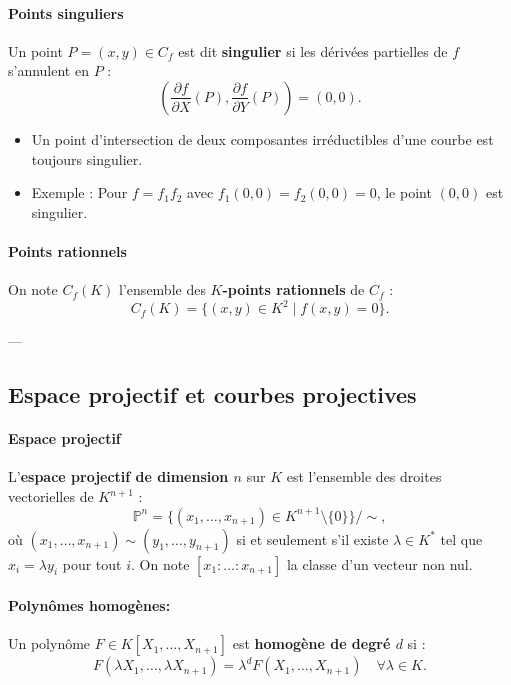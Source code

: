 \documentclass[12pt,a4paper]{article}
\begin{document}
	\paragraph{Points singuliers}
	Un point $P = (x, y) \in C_f$ est dit \textbf{singulier} si les dérivées partielles de $f$ s’annulent en $P$ :
	\[
	\left(\frac{\partial f}{\partial X}(P), \frac{\partial f}{\partial Y}(P)\right) = (0, 0).
	\]
	
	\begin{itemize}
		\item Un point d’intersection de deux composantes irréductibles d’une courbe est toujours singulier.
		\item Exemple : Pour $f = f_1 f_2$ avec $f_1(0,0) = f_2(0,0) = 0$, le point $(0,0)$ est singulier.
	\end{itemize}
	
	\paragraph{Points rationnels}
	On note $C_f(K)$ l’ensemble des \textbf{$K$-points rationnels} de $C_f$ :
	\[
	C_f(K) = \{(x, y) \in K^2 \mid f(x, y) = 0\}.
	\]
	
	---
	
	\subsection{Espace projectif et courbes projectives}
	
	\paragraph{Espace projectif}
	L’\textbf{espace projectif de dimension $n$} sur $K$ est l’ensemble des droites vectorielles de $K^{n+1}$ :
	\[
	\mathbb{P}^n = \{(x_1, \dots, x_{n+1}) \in K^{n+1} \setminus \{0\}\} / \sim,
	\]
	où $(x_1, \dots, x_{n+1}) \sim (y_1, \dots, y_{n+1})$ si et seulement s’il existe $\lambda \in K^*$ tel que $x_i = \lambda y_i$ pour tout $i$.
	On note $[x_1 : \dots : x_{n+1}]$ la classe d’un vecteur non nul.
	
	\paragraph{Polynômes homogènes:}
	Un polynôme $F \in K[X_1, \dots, X_{n+1}]$ est \textbf{homogène de degré $d$} si :
	\[
	F(\lambda X_1, \dots, \lambda X_{n+1}) = \lambda^d F(X_1, \dots, X_{n+1}) \quad \forall \lambda \in K.
	\]
	
\end{document}

